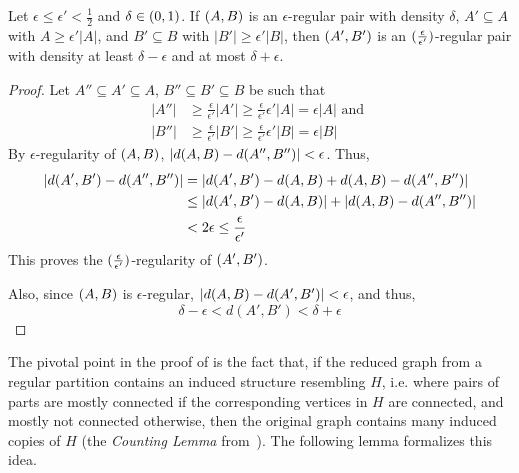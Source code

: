         \begin{lemma} \label{lem:regularity_is_transitive}
            Let $\epsilon \leq \epsilon' < \frac{1}{2}$ and $\delta \in ( 0, 1 )$.
            If $( A,B )$ is an $\epsilon$-regular pair with density $\delta$, $A' \subseteq A$ with $A \geq \epsilon' |A|$, and
            $B' \subseteq B$ with $|B'| \geq \epsilon' |B|$, then $( A', B' )$ is an $( \frac{\epsilon}{\epsilon'} )$-regular
            pair with density at least $\delta - \epsilon$ and at most $\delta + \epsilon$.
            \begin{proof}
                Let $A'' \subseteq A' \subseteq A$, $B'' \subseteq B' \subseteq B$ be such that
                \begin{align*}
                    |A''| & \geq \frac{\epsilon}{\epsilon'} |A'| \geq \frac{\epsilon}{\epsilon'} \epsilon' |A| = \epsilon |A|
                    \text{ and } \\
                    |B''| & \geq \frac{\epsilon}{\epsilon'} |B'| \geq \frac{\epsilon}{\epsilon'} \epsilon' |B| = \epsilon |B|
                \end{align*}
                By $\epsilon$-regularity of $( A,B )$, $| d(A,B) - d(A'',B'') | < \epsilon$.
                Thus,
                \begin{align*}
                    | d(A',B') - d(A'',B'') |
                        & = | d(A',B') - d(A,B) + d(A,B) - d(A'',B'') | \\
                        & \leq | d(A',B') - d(A,B) | + | d(A,B) - d(A'',B'') | \\
                        & < 2 \epsilon \leq \frac{\epsilon}{\epsilon'}
                \end{align*}
                This proves the $( \frac{\epsilon}{\epsilon'} )$-regularity of $( A',B' )$.

                Also, since $( A,B )$ is $\epsilon$-regular, $| d(A,B) - d(A',B') | < \epsilon$,
                and thus,
                \[
                    \delta - \epsilon < d(A',B') < \delta + \epsilon
                \]
            \end{proof}
        \end{lemma}

        The pivotal point in the proof of  is the fact that, if the
        reduced graph  from a regular partition contains an induced structure resembling $H$, i.e. where pairs of parts are
        mostly connected if the corresponding vertices in $H$ are connected, and mostly not connected otherwise,
        then the original graph contains many induced copies of $H$ (the \emph{Counting Lemma}
        from~\cite{the_regulariy_lemma_and_its_applications_in_graph_theory}).
        The following lemma formalizes this idea.


